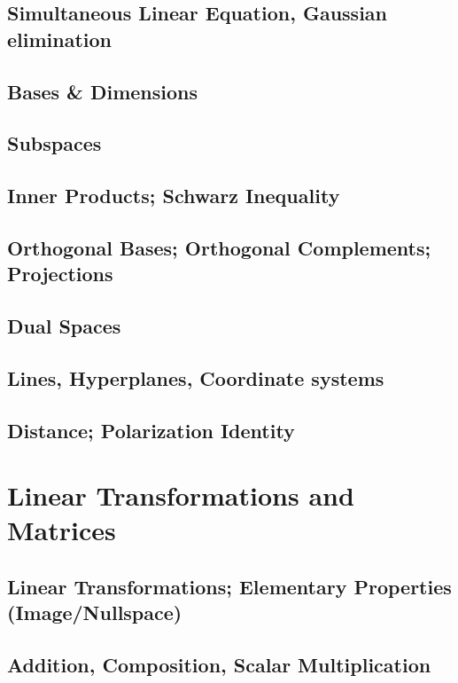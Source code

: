 \documentclass[11pt]{article}
\theoremstyle{definition}
\theoremstyle{plain}
\theoremstyle{remark}
\begin{document}
\subsection{Simultaneous Linear Equation, Gaussian elimination}

\subsection{Bases \& Dimensions}

\subsection{Subspaces}

\subsection{Inner Products; Schwarz Inequality}

\subsection{Orthogonal Bases; Orthogonal Complements; Projections}

\subsection{Dual Spaces}

\subsection{Lines, Hyperplanes, Coordinate systems}

\subsection{Distance; Polarization Identity}

\section{Linear Transformations and Matrices}

\subsection{Linear Transformations; Elementary Properties (Image/Nullspace)}

\subsection{Addition, Composition, Scalar Multiplication}
\end{document}
